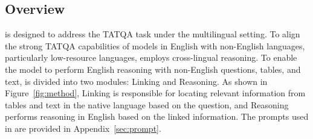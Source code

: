 \subsection{Overview}
\ourmethod is designed to address the TATQA task under the multilingual setting. 
To align the strong TATQA capabilities of models in English with non-English languages, particularly low-resource languages, \ourmethod employs cross-lingual reasoning. 
To enable the model to perform English reasoning with non-English questions, tables, and text, \ourmethod is divided into two modules: Linking and Reasoning. 
As shown in Figure~\ref{fig:method}, Linking is responsible for locating relevant information from tables and text in the native language based on the question, and Reasoning performs reasoning in English based on the linked information.
The prompts used in \ourmethod are provided in Appendix~\ref{sec:prompt}.


